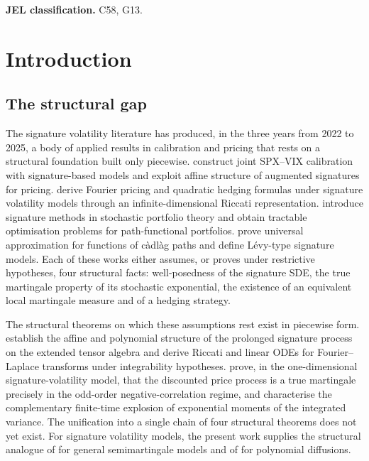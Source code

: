 \documentclass[11pt,oneside]{article}
\theoremstyle{plain}
\theoremstyle{definition}
\theoremstyle{remark}
\begin{document}
\medskip
\noindent\textbf{JEL classification.} C58, G13.

\clearpage
\tableofcontents
\clearpage

\section{Introduction}

\subsection{The structural gap}

The signature volatility literature has produced, in the three years from 2022 to 2025, a body of applied results in calibration and pricing that rests on a structural foundation built only piecewise. \citet{CuchieroGazzaniMoellerSvalutoFerro2025} construct joint SPX--VIX calibration with signature-based models and exploit affine structure of augmented signatures for pricing. \citet{AbiJaberGerard2025} derive Fourier pricing and quadratic hedging formulas under signature volatility models through an infinite-dimensional Riccati representation. \citet{CuchieroMoeller2023} introduce signature methods in stochastic portfolio theory and obtain tractable optimisation problems for path-functional portfolios. \citet{CuchieroPrimaveraSvalutoFerro2025} prove universal approximation for functions of c\`adl\`ag paths and define L\'evy-type signature models. Each of these works either assumes, or proves under restrictive hypotheses, four structural facts: well-posedness of the signature SDE, the true martingale property of its stochastic exponential, the existence of an equivalent local martingale measure and of a hedging strategy.

The structural theorems on which these assumptions rest exist in piecewise form. \citet{CuchieroSvalutoFerroTeichmann2023} establish the affine and polynomial structure of the prolonged signature process on the extended tensor algebra and derive Riccati and linear ODEs for Fourier--Laplace transforms under integrability hypotheses. \citet{AbiJaberGassiatSotnikov2025} prove, in the one-dimensional signature-volatility model, that the discounted price process is a true martingale precisely in the odd-order negative-correlation regime, and characterise the complementary finite-time explosion of exponential moments of the integrated variance. The unification into a single chain of four structural theorems does not yet exist. For signature volatility models, the present work supplies the structural analogue of \citet{DelbaenSchachermayer1994} for general semimartingale models and of \citet{FilipovicLarsson2016} for polynomial diffusions.
\end{document}
